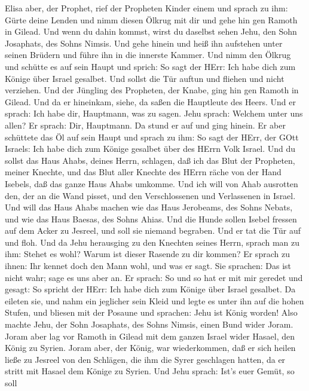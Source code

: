  Elisa aber, der Prophet, rief der Propheten Kinder einem
und sprach zu ihm: Gürte deine Lenden und nimm diesen Ölkrug mit dir und
gehe hin gen Ramoth in Gilead.  Und wenn du dahin kommst,
wirst du daselbst sehen Jehu, den Sohn Josaphats, des Sohns Nimsis. Und
gehe hinein und heiß ihn aufstehen unter seinen Brüdern und führe ihn in
die innerste Kammer.  Und nimm den Ölkrug und schütte es auf
sein Haupt und sprich: So sagt der HErr: Ich habe dich zum Könige über
Israel gesalbet. Und sollst die Tür auftun und fliehen und nicht
verziehen.  Und der Jüngling des Propheten, der Knabe, ging
hin gen Ramoth in Gilead.  Und da er hineinkam, siehe, da
saßen die Hauptleute des Heers. Und er sprach: Ich habe dir, Hauptmann,
was zu sagen. Jehu sprach: Welchem unter uns allen? Er sprach: Dir,
Hauptmann.  Da stund er auf und ging hinein. Er aber
schüttete das Öl auf sein Haupt und sprach zu ihm: So sagt der HErr, der
GOtt Israels: Ich habe dich zum Könige gesalbet über des HErrn Volk
Israel.  Und du sollst das Haus Ahabs, deines Herrn,
schlagen, daß ich das Blut der Propheten, meiner Knechte, und das Blut
aller Knechte des HErrn räche von der Hand Isebels,  daß das
ganze Haus Ahabs umkomme. Und ich will von Ahab ausrotten den, der an
die Wand pisset, und den Verschlossenen und Verlassenen in Israel.
 Und will das Haus Ahabs machen wie das Haus Jerobeams, des
Sohns Nebats, und wie das Haus Baesas, des Sohns Ahias. 
Und die Hunde sollen Isebel fressen auf dem Acker zu Jesreel, und soll
sie niemand begraben. Und er tat die Tür auf und floh.  Und
da Jehu herausging zu den Knechten seines Herrn, sprach man zu ihm:
Stehet es wohl? Warum ist dieser Rasende zu dir kommen? Er sprach zu
ihnen: Ihr kennet doch den Mann wohl, und was er sagt.  Sie
sprachen: Das ist nicht wahr; sage es uns aber an. Er sprach: So und so
hat er mit mir geredet und gesagt: So spricht der HErr: Ich habe dich
zum Könige über Israel gesalbet.  Da eileten sie, und nahm
ein jeglicher sein Kleid und legte es unter ihn auf die hohen Stufen,
und bliesen mit der Posaune und sprachen: Jehu ist König worden!
 Also machte Jehu, der Sohn Josaphats, des Sohns Nimsis,
einen Bund wider Joram. Joram aber lag vor Ramoth in Gilead mit dem
ganzen Israel wider Hasael, den König zu Syrien.  Joram
aber, der König, war wiederkommen, daß er sich heilen ließe zu Jesreel
von den Schlägen, die ihm die Syrer geschlagen hatten, da er stritt mit
Hasael dem Könige zu Syrien. Und Jehu sprach: Ist's euer Gemüt, so soll
